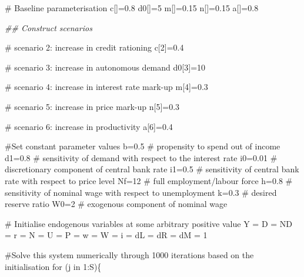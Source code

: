 \documentclass[
  letterpaper,
  DIV=11,
  numbers=noendperiod]{scrreprt}
\newenvironment{Shaded}{\begin{snugshade}}{\end{snugshade}}
\newcommand{\CommentTok}[1]{\textcolor[rgb]{0.37,0.37,0.37}{#1}}
\newcommand{\ControlFlowTok}[1]{\textcolor[rgb]{0.00,0.23,0.31}{#1}}
\newcommand{\DecValTok}[1]{\textcolor[rgb]{0.68,0.00,0.00}{#1}}
\newcommand{\DocumentationTok}[1]{\textcolor[rgb]{0.37,0.37,0.37}{\textit{#1}}}
\newcommand{\FloatTok}[1]{\textcolor[rgb]{0.68,0.00,0.00}{#1}}
\newcommand{\NormalTok}[1]{\textcolor[rgb]{0.00,0.23,0.31}{#1}}
\newcommand{\OtherTok}[1]{\textcolor[rgb]{0.00,0.23,0.31}{#1}}
\newcommand{\SpecialCharTok}[1]{\textcolor[rgb]{0.37,0.37,0.37}{#1}}
\begin{document}
\begin{Shaded}
\begin{Highlighting}[]
\CommentTok{\# Baseline parameterisation}
\NormalTok{c[]}\OtherTok{=}\FloatTok{0.8} 
\NormalTok{d0[]}\OtherTok{=}\DecValTok{5}
\NormalTok{m[]}\OtherTok{=}\FloatTok{0.15}
\NormalTok{n[]}\OtherTok{=}\FloatTok{0.15}  
\NormalTok{a[]}\OtherTok{=}\FloatTok{0.8} 

\DocumentationTok{\#\# Construct scenarios}

\CommentTok{\# scenario 2: increase in credit rationing}
\NormalTok{c[}\DecValTok{2}\NormalTok{]}\OtherTok{=}\FloatTok{0.4}

\CommentTok{\# scenario 3: increase in autonomous demand}
\NormalTok{d0[}\DecValTok{3}\NormalTok{]}\OtherTok{=}\DecValTok{10}

\CommentTok{\# scenario 4: increase in interest rate mark{-}up}
\NormalTok{m[}\DecValTok{4}\NormalTok{]}\OtherTok{=}\FloatTok{0.3}

\CommentTok{\# scenario 5: increase in price mark{-}up}
\NormalTok{n[}\DecValTok{5}\NormalTok{]}\OtherTok{=}\FloatTok{0.3}

\CommentTok{\# scenario 6: increase in productivity}
\NormalTok{a[}\DecValTok{6}\NormalTok{]}\OtherTok{=}\FloatTok{0.4}


\CommentTok{\#Set constant parameter values}
\NormalTok{b}\OtherTok{=}\FloatTok{0.5}   \CommentTok{\# propensity to spend out of income}
\NormalTok{d1}\OtherTok{=}\FloatTok{0.8}  \CommentTok{\# sensitivity of demand with respect to the interest rate}
\NormalTok{i0}\OtherTok{=}\FloatTok{0.01} \CommentTok{\# discretionary component of central bank rate}
\NormalTok{i1}\OtherTok{=}\FloatTok{0.5}  \CommentTok{\# sensitivity of central bank rate with respect to price level}
\NormalTok{Nf}\OtherTok{=}\DecValTok{12}   \CommentTok{\# full employment/labour force}
\NormalTok{h}\OtherTok{=}\FloatTok{0.8}   \CommentTok{\# sensitivity of nominal wage with respect to unemployment}
\NormalTok{k}\OtherTok{=}\FloatTok{0.3}   \CommentTok{\# desired reserve ratio}
\NormalTok{W0}\OtherTok{=}\DecValTok{2}    \CommentTok{\# exogenous component of nominal wage}

\CommentTok{\# Initialise endogenous variables at some arbitrary positive value }
\NormalTok{Y }\OtherTok{=}\NormalTok{ D }\OtherTok{=}\NormalTok{ ND }\OtherTok{=}\NormalTok{ r }\OtherTok{=}\NormalTok{ N }\OtherTok{=}\NormalTok{ U }\OtherTok{=}\NormalTok{ P }\OtherTok{=}\NormalTok{ w }\OtherTok{=}\NormalTok{ W }\OtherTok{=}\NormalTok{ i }\OtherTok{=}\NormalTok{ dL }\OtherTok{=}\NormalTok{ dR }\OtherTok{=}\NormalTok{ dM }\OtherTok{=} \DecValTok{1}

\CommentTok{\#Solve this system numerically through 1000 iterations based on the initialisation}
\ControlFlowTok{for}\NormalTok{ (j }\ControlFlowTok{in} \DecValTok{1}\SpecialCharTok{:}\NormalTok{S)\{}
  

\end{Highlighting}
\end{Shaded}
\end{document}
